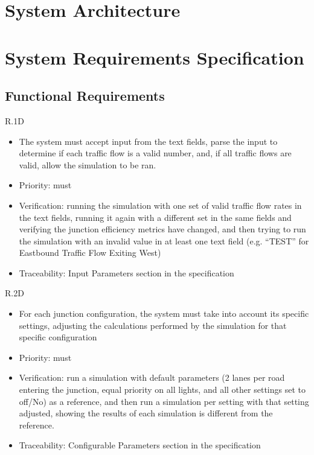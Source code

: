 \documentclass{article}
\begin{document}
\section{System Architecture}

\section{System Requirements Specification}
\subsection{Functional Requirements}
R.1D
\begin{itemize}
  \item The system must accept input from the text fields, parse the input to determine if each traffic flow is a valid number, and, if all traffic flows are valid, allow the simulation to be ran.
  \item Priority: must
  \item Verification: running the simulation with one set of valid traffic flow rates in the text fields, running it again with a different set in the same fields and verifying the junction efficiency metrics have changed, and then trying to run the simulation with an invalid value in at least one text field (e.g. “TEST” for Eastbound Traffic Flow Exiting West)
  \item Traceability: Input Parameters section in the specification
\end{itemize}

R.2D
\begin{itemize}
  \item For each junction configuration, the system must take into account its specific settings, adjusting the calculations performed by the simulation for that specific configuration
  \item Priority: must
  \item Verification: run a simulation with default parameters (2 lanes per road entering the junction, equal priority on all lights, and all other settings set to off/No) as a reference, and then run a simulation per setting with that setting adjusted, showing the results of each simulation is different from the reference.
  \item Traceability: Configurable Parameters section in the specification
\end{itemize}
\end{document}
